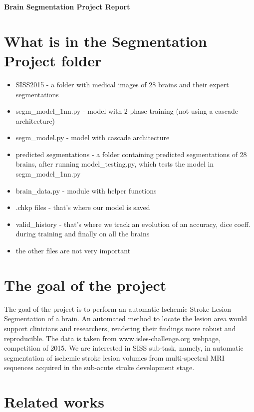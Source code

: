 \documentclass[12pt]{report}
\begin{document}
\begin{center}
      \Large\textbf{Brain Segmentation Project Report}
\end{center}

\section*{What is in the Segmentation Project folder}

\begin{itemize}
  \item {SISS2015 - a folder with medical images of 28 brains and their expert segmentations}
  \item {segm\_model\_1nn.py - model with 2 phase training (not using a cascade architecture)}
  \item {segm\_model.py - model with cascade architecture}
  \item {predicted segmentations - a folder containing predicted segmentations of 28 brains, after running model\_testing.py, which tests the model in segm\_model\_1nn.py}
  \item {brain\_data.py - module with helper functions}
  \item {.chkp files - that's where our model is saved}
  \item {valid\_history - that's where we track an evolution of an accuracy, dice coeff. during training and finally on all the brains}
  \item {the other files are not very important}
  
\end{itemize}


\section*{The goal of the project}

The goal of the project is to perform an automatic Ischemic Stroke Lesion Segmentation of a brain. An automated method to locate the lesion area would support clinicians and researchers, rendering their findings more robust and reproducible. The data is taken from www.isles-challenge.org webpage, competition of 2015. We are interested in SISS sub-task, namely, in automatic segmentation of ischemic stroke lesion volumes from multi-spectral MRI sequences acquired in the sub-acute stroke development stage.

\section*{Related works}
\end{document}
